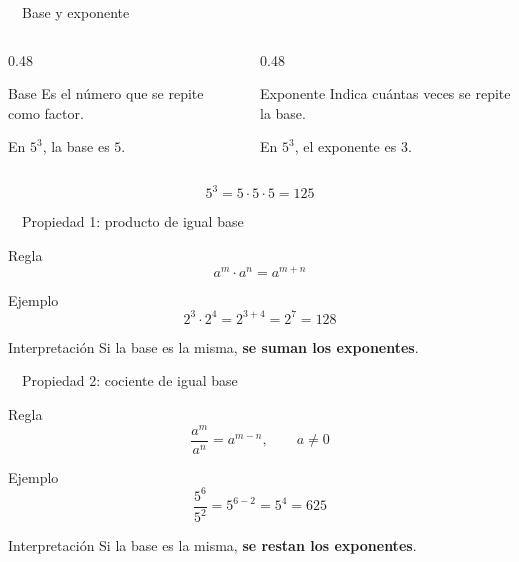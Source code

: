\documentclass[aspectratio=169,10pt,handout]{beamer}
\newcommand{\destacar}[1]{\textcolor{USTBlueDark}{\textbf{#1}}}
\newcommand{\iconoDesarrollo}{\faBrain}
\begin{document}
	\begin{frame}{\iconoDesarrollo\ \ Base y exponente}
		\begin{columns}[T,totalwidth=\textwidth]
			\begin{column}{0.48\textwidth}
				\begin{block}{Base}
					Es el número que se repite como factor.
					
					En \(5^3\), la base es \(5\).
				\end{block}
			\end{column}
			\begin{column}{0.48\textwidth}
				\begin{exampleblock}{Exponente}
					Indica cuántas veces se repite la base.
					
					En \(5^3\), el exponente es \(3\).
				\end{exampleblock}
			\end{column}
		\end{columns}
		
		\vspace{0.3cm}
		\centering
		\[
		5^3=5\cdot5\cdot5=125
		\]
	\end{frame}
	
	\begin{frame}{\iconoDesarrollo\ \ Propiedad 1: producto de igual base}
		\begin{block}{Regla}
			\[
			a^m\cdot a^n = a^{m+n}
			\]
		\end{block}
		
		\begin{exampleblock}{Ejemplo}
			\[
			2^3\cdot2^4 = 2^{3+4}=2^7=128
			\]
		\end{exampleblock}
		
		\begin{alertblock}{Interpretación}
			Si la base es la misma, \destacar{se suman los exponentes}.
		\end{alertblock}
	\end{frame}
	
	\begin{frame}{\iconoDesarrollo\ \ Propiedad 2: cociente de igual base}
		\begin{block}{Regla}
			\[
			\frac{a^m}{a^n}=a^{m-n}, \qquad a\neq 0
			\]
		\end{block}
		
		\begin{exampleblock}{Ejemplo}
			\[
			\frac{5^6}{5^2}=5^{6-2}=5^4=625
			\]
		\end{exampleblock}
		
		\begin{alertblock}{Interpretación}
			Si la base es la misma, \destacar{se restan los exponentes}.
		\end{alertblock}
	\end{frame}
	
\end{document}
